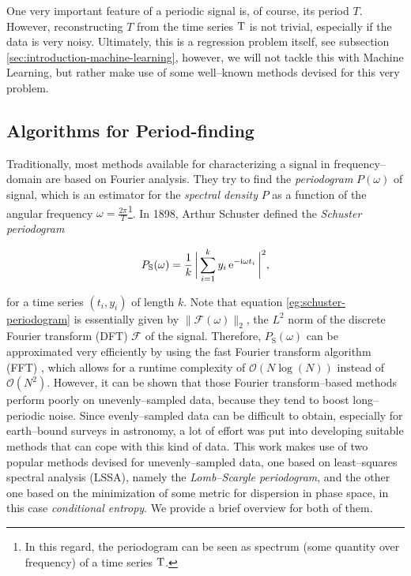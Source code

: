 One very important feature of a periodic signal is, of course, its period $T$. However, reconstructing $T$ from the time series $\mathrm{T}$ is not trivial, especially if the data is very noisy. Ultimately, this is a regression problem itself, see subsection \ref{sec:introduction-machine-learning}, however, we will not tackle this with Machine Learning, but rather make use of some well--known methods devised for this very problem.

\subsection{Algorithms for Period-finding}
\label{subsec:period-finding}

Traditionally, most methods available for characterizing a signal in frequency--domain are based on Fourier analysis. They try to find the \emph{periodogram} $P(\omega)$ of signal, which is an estimator for the \emph{spectral density} $P$ as a function of the angular frequency $\omega = \frac{2 \pi}{T}$\footnote{In this regard, the periodogram can be seen as spectrum (some quantity over frequency) of a time series $\mathrm{T}$.}. In 1898, Arthur Schuster defined the \emph{Schuster periodogram}

\begin{equation}
\label{eg:schuster-periodogram}
P_{\text{S}}(\omega) = \frac{1}{k} \, \biggl| \, \sum\limits_{i=1}^{k} y_i \, \mathrm{e}^{-\mathrm{i} \omega t_i} \, \biggr|^2,
\end{equation}


for a time series $(t_i, y_i)$ of length $k$. Note that equation \eqref{eg:schuster-periodogram} is essentially given by $\| \mathcal{F}(\omega) \|_2 $, the $L^2$ norm of the discrete Fourier transform (DFT) $\mathcal{F}$ of the signal. Therefore, $P_{\text{S}}(\omega)$ can be approximated very efficiently by using the fast Fourier transform algorithm (FFT) \citep{cooley1965}, which allows for a runtime complexity of $\mathcal{O}(N\log{(N)})$ instead of $\mathcal{O}(N^2)$. However, it can be shown that those Fourier transform--based methods perform poorly on unevenly--sampled data, because they tend to boost long--periodic noise. Since evenly--sampled data can be difficult to obtain, especially for earth--bound surveys in astronomy, a lot of effort was put into developing suitable methods that can cope with this kind of data. This work makes use of two popular methods devised for unevenly--sampled data, one based on least--squares spectral analysis (LSSA), namely the \emph{Lomb--Scargle periodogram}, and the other one based on the minimization of some metric for dispersion in phase space, in this case \emph{conditional entropy}. We provide a brief overview for both of them.

